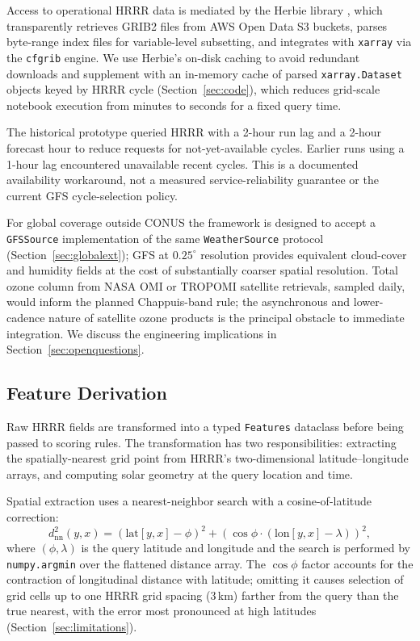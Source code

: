 \documentclass[11pt,a4paper]{article}
\begin{document}
Access to operational HRRR data is mediated by the Herbie library \citep{blaylock2024herbie}, which transparently retrieves GRIB2 files from AWS Open Data S3 buckets, parses byte-range index files for variable-level subsetting, and integrates with \texttt{xarray} via the \texttt{cfgrib} engine. We use Herbie's on-disk caching to avoid redundant downloads and supplement with an in-memory cache of parsed \texttt{xarray.Dataset} objects keyed by HRRR cycle (Section~\ref{sec:code}), which reduces grid-scale notebook execution from minutes to seconds for a fixed query time.

The historical prototype queried HRRR with a 2-hour run lag and a 2-hour forecast hour to reduce requests for not-yet-available cycles. Earlier runs using a 1-hour lag encountered unavailable recent cycles. This is a documented availability workaround, not a measured service-reliability guarantee or the current GFS cycle-selection policy.

For global coverage outside CONUS the framework is designed to accept a \texttt{GFSSource} implementation of the same \texttt{WeatherSource} protocol (Section~\ref{sec:globalext}); GFS at $0.25^\circ$ resolution provides equivalent cloud-cover and humidity fields at the cost of substantially coarser spatial resolution. Total ozone column from NASA OMI or TROPOMI satellite retrievals, sampled daily, would inform the planned Chappuis-band rule; the asynchronous and lower-cadence nature of satellite ozone products is the principal obstacle to immediate integration. We discuss the engineering implications in Section~\ref{sec:openquestions}.

\subsection{Feature Derivation}

Raw HRRR fields are transformed into a typed \texttt{Features} dataclass before being passed to scoring rules. The transformation has two responsibilities: extracting the spatially-nearest grid point from HRRR's two-dimensional latitude--longitude arrays, and computing solar geometry at the query location and time.

Spatial extraction uses a nearest-neighbor search with a cosine-of-latitude correction:
\begin{equation}
d^2_{\text{nn}}(y, x) = (\text{lat}[y,x] - \phi)^2 + (\cos\phi \cdot (\text{lon}[y,x] - \lambda))^2,
\label{eq:coslat}
\end{equation}
where $(\phi, \lambda)$ is the query latitude and longitude and the search is performed by \texttt{numpy.argmin} over the flattened distance array. The $\cos\phi$ factor accounts for the contraction of longitudinal distance with latitude; omitting it causes selection of grid cells up to one HRRR grid spacing (3\,km) farther from the query than the true nearest, with the error most pronounced at high latitudes (Section~\ref{sec:limitations}).
\end{document}
